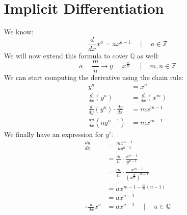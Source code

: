 \documentclass[../main]{subfiles}
\begin{document}
%
\chapter{Implicit Differentiation}
We know:
\[ \frac{d}{dx} x^a = ax^{a-1} \quad \mid \quad a \in \mathbb{Z} \]
We will now extend this formula to cover $\mathbb{Q}$ as well:
\[
    a = \frac{m}{n} \rightarrow y = x^{\frac{m}{n}}
    \quad \mid \quad
    m, n \in \mathbb{Z}
\]
We can start computing the derivative using the chain rule:%
%
\begin{align*}
    y^n                                                 & = x^n                             \\
    \frac{d}{dx} \left( y^n \right)                     & = \frac{d}{dx} \left( x^m \right) \\
    \frac{d}{dy} \left( y^n \right) \cdot \frac{dy}{dx} & = mx^{m - 1}                      \\
    \frac{dy}{dx} \left( ny^{n - 1} \right)             & = mx^{m - 1}
\end{align*}
%
We finally have an expression for $y'$:
%
\begin{align*}
    \frac{dy}{dx}               & = \frac{mx^{m - 1}}{ny^{n - 1}}                                              \\
                                & = \frac{m}{n} \cdot \frac{x^{m - 1}}{y^{n - 1}}                              \\
                                & = \frac{m}{n} \cdot \frac{x^{m - 1}}{\left( x^{\frac{m}{n}} \right)^{n - 1}} \\
                                & = ax^{m - 1 - \frac{m}{n}(n - 1)}                                            \\
                                & = ax^{a - 1}                                                                 \\
    \therefore \frac{d}{dx} x^a & = ax^{a - 1} \quad \mid \quad a \in \mathbb{Q}
\end{align*}
%
\end{document}
